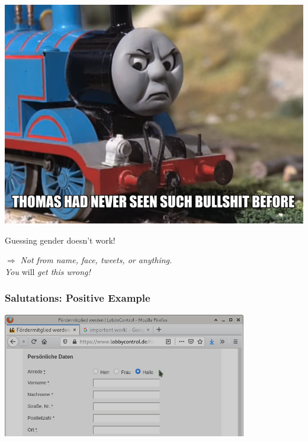 \documentclass[aspectratio=169,x11names]{beamer}
\begin{document}
\begin{frame}
\begin{center}
\includegraphics[height=0.8\textheight,keepaspectratio]{images/thomas.png} 
\end{center}
\end{frame}

\begin{frame}
\begin{center}
\huge
Guessing gender doesn't work!
\medskip

\Large
$\Rightarrow$ \emph{Not from name, face, tweets, or anything. \\ You} will \emph{get this wrong!}
\end{center}
\end{frame}

\begin{frame}
\frametitle{Salutations: Positive Example}
\begin{center}
\includegraphics[width=0.8\textwidth,keepaspectratio]{images/lobbycontrol.png} 
\end{center}
\end{frame}
\end{document}
